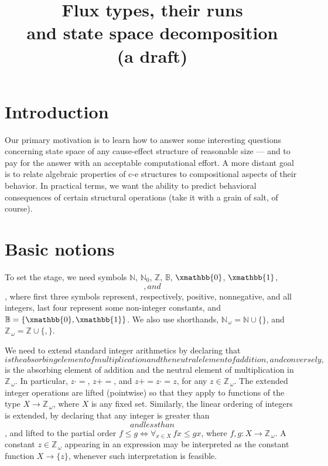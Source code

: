 \documentclass [a4paper,12pt] {article}
\theoremstyle{definition}
\newcommand{\xbot}{}
\DeclareRobustCommand{\xbot}{\mathop{\textstyle\mathsmaller{\bm\bot}}}
\newcommand{\xtop}{}
\DeclareRobustCommand{\xtop}{\mathop{\textstyle\mathsmaller{\bm\top}}}
\begin{document}
\title {Flux types, their runs\\and state space decomposition\\(a
  draft)} \author {} \date {} \maketitle

\section {Introduction}

Our primary motivation is to learn how to answer some interesting
questions concerning state space of any cause-effect structure of
reasonable size --- and to pay for the answer with an acceptable
computational effort.  A more distant goal is to relate algebraic
properties of \mbox {c-e} structures to compositional aspects of their
behavior.  In practical terms, we want the ability to predict
behavioral consequences of certain structural operations (take it with
a grain of salt, of course).

\section {Basic notions}

To set the stage, we need symbols $\mathbb {N}$, $\mathbb {N}_0$,
$\mathbb {Z}$, $\mathbb {B}$, $\xmathbb {0}$, $\xmathbb {1}$, $\xbot$,
and $\xtop$, where first three symbols represent, respectively,
positive, nonnegative, and all integers, last four represent some
non-integer constants, and $\mathbb {B} = \{ \xmathbb {0}, \xmathbb
{1} \}$.  We also use shorthands, $\mathbb {N}_{\,\omega} = \mathbb
{N}\cup\{\xtop\}$, and $\mathbb {Z}_{\,\omega} = \mathbb
{Z}\cup\{\xbot,\xtop\}$.

We need to extend standard integer arithmetics by declaring that
$\xbot$ is the absorbing element of multiplication and the neutral
element of addition, and conversely, $\xtop$ is the absorbing element
of addition and the neutral element of multiplication in $\mathbb
{Z}_{\,\omega}$.  In particular, $z \cdot \xbot = \xbot$, $z + \xtop =
\xtop$, and $z + \xbot = z \cdot \xtop = z$, for any $z \in \mathbb
     {Z}_{\,\omega}$.  The extended integer operations are lifted
     (pointwise) so that they apply to functions of the type $X
     \rightarrow \mathbb {Z}_{\,\omega}$, where $X$ is any fixed set.
     Similarly, the linear ordering of integers is extended, by
     declaring that any integer is greater than $\xbot$ and less than
     $\xtop$, and lifted to the partial order $f \leq g \iff
     \forall_{x \in X}\,fx \leq gx$, where $f, g\!: X \rightarrow
     \mathbb {Z}_{\,\omega}$.  A constant $z \in \mathbb
             {Z}_{\,\omega}$ appearing in an expression may be
             interpreted as the constant function $X \rightarrow \{ z
             \}$, whenever such interpretation is feasible.
\end{document}
